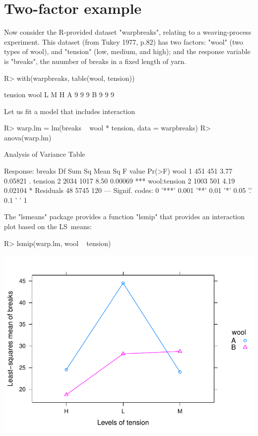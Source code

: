 \documentclass{article}
\begin{document}
\section{Two-factor example}
Now consider the R-provided dataset "warpbreaks", relating to a weaving-process experiment. This dataset (from Tukey 1977, p.82) has two factors: "wool" (two types of wool), and "tension" (low, medium, and high); and the response variable is "breaks", the nuumber of breaks in a fixed length of yarn.
\begin{Winput}
R> with(warpbreaks, table(wool, tension))
\end{Winput}
\begin{Woutput}
    tension
wool L M H
   A 9 9 9
   B 9 9 9
\end{Woutput}
Let us fit a model that includes interaction
\begin{Winput}
R> warp.lm = lm(breaks ~ wool * tension, data = warpbreaks)
R> anova(warp.lm)
\end{Winput}
\begin{Woutput}
Analysis of Variance Table

Response: breaks
             Df Sum Sq Mean Sq F value  Pr(>F)
wool          1    451     451    3.77 0.05821 .
tension       2   2034    1017    8.50 0.00069 ***
wool:tension  2   1003     501    4.19 0.02104 *
Residuals    48   5745     120
---
Signif. codes:  0 '***' 0.001 '**' 0.01 '*' 0.05 '.' 0.1 ' ' 1
\end{Woutput}
The "lsmeans" package provides a function "lsmip" that provides an interaction plot based on the LS~means:
\begin{Winput}
R> lsmip(warp.lm, wool ~ tension)
\end{Winput}
\includegraphics[scale=.5]{using-lsmeans-warp-intplot-fig.pdf}
\end{document}
